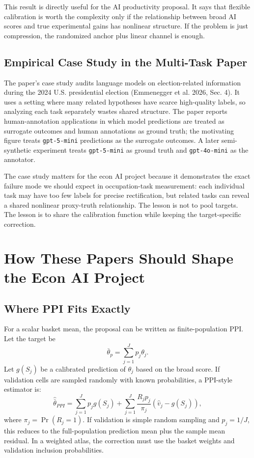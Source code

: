 \documentclass[11pt]{article}
\begin{document}
This result is directly useful for the AI productivity proposal. It says that flexible calibration is worth the complexity only if the relationship between broad AI scores and true experimental gains has nonlinear structure. If the problem is just compression, the randomized anchor plus linear channel is enough.

\subsection{Empirical Case Study in the Multi-Task Paper}

The paper's case study audits language models on election-related information during the 2024 U.S. presidential election (Emmenegger et al. 2026, Sec. 4). It uses a setting where many related hypotheses have scarce high-quality labels, so analyzing each task separately wastes shared structure. The paper reports human-annotation applications in which model predictions are treated as surrogate outcomes and human annotations as ground truth; the motivating figure treats \texttt{gpt-5-mini} predictions as the surrogate outcomes. A later semi-synthetic experiment treats \texttt{gpt-5-mini} as ground truth and \texttt{gpt-4o-mini} as the annotator.

The case study matters for the econ AI project because it demonstrates the exact failure mode we should expect in occupation-task measurement: each individual task may have too few labels for precise rectification, but related tasks can reveal a shared nonlinear proxy-truth relationship. The lesson is not to pool targets. The lesson is to share the calibration function while keeping the target-specific correction.

\section{How These Papers Should Shape the Econ AI Project}

\subsection{Where PPI Fits Exactly}

For a scalar basket mean, the proposal can be written as finite-population PPI. Let the target be
\[
  \bar\theta_p=\sum_{j=1}^J p_j\theta_j.
\]
Let $g(S_j)$ be a calibrated prediction of $\theta_j$ based on the broad score. If validation cells are sampled randomly with known probabilities, a PPI-style estimator is:
\[
  \widehat{\bar\theta}_{PPI}
  =
  \sum_{j=1}^J p_j g(S_j)
  +
  \sum_{j=1}^J
  \frac{R_j p_j}{\pi_j}
  \left(\widehat v_j-g(S_j)\right),
\]
where $\pi_j=\Pr(R_j=1)$. If validation is simple random sampling and $p_j=1/J$, this reduces to the full-population prediction mean plus the sample mean residual. In a weighted atlas, the correction must use the basket weights and validation inclusion probabilities.
\end{document}
